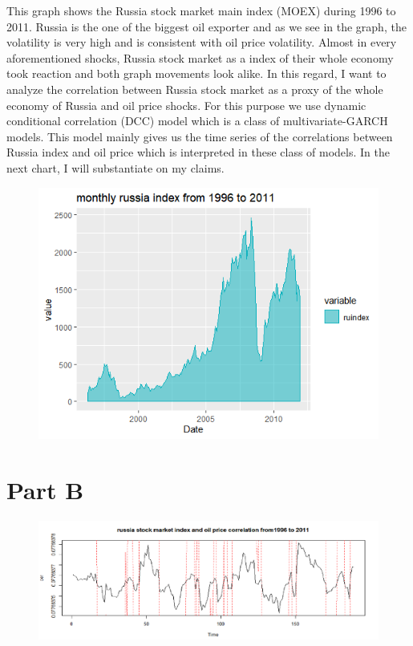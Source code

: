 \documentclass{article}
\begin{document}
This graph shows the Russia stock market main index (MOEX) during 1996 to 2011. Russia is the one of the biggest oil exporter and as we see in the graph, the volatility is very high and is consistent with oil price volatility. Almost in every aforementioned shocks, Russia stock market as a index of their whole economy took reaction and both graph movements look alike. In this regard, I want to analyze the correlation between Russia stock market as a proxy of the whole economy of Russia and oil price shocks. For this purpose  we use dynamic conditional correlation (DCC) model which is a class of multivariate-GARCH models. This model mainly gives us the time series of the correlations between Russia index and oil price which is interpreted in these class of models. In the next chart, I will substantiate on my claims.

\begin{figure}[htbp]
	\begin{center}
		\includegraphics{Rplot.png}
		\caption{ }
	\end{center}
\end{figure}

\section*{Part B}
\begin{figure}[htbp]
	\begin{center}
		\includegraphics[width=\linewidth]{Rplot02.png}
		\caption{ }
	\end{center}
\end{figure}
\end{document}
